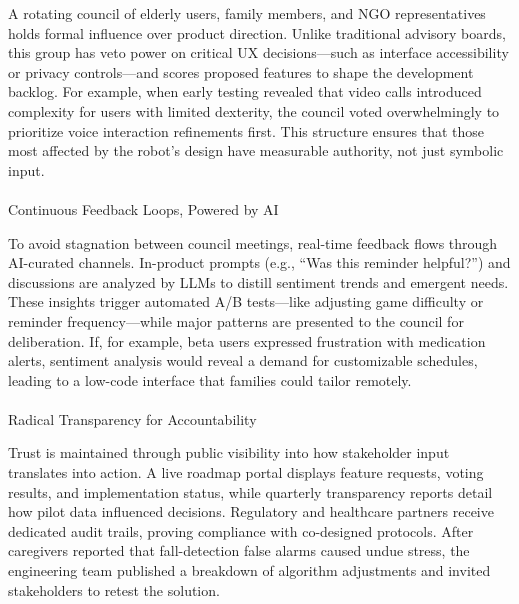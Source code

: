 \documentclass[
  letterpaper,
  DIV=11,
  numbers=noendperiod]{scrartcl}
\makeatletter
\let\oldparagraph\paragraph
\renewcommand{\paragraph}{
    \@ifstar
      \xxxParagraphStar
      \xxxParagraphNoStar
  }
\newcommand{\xxxParagraphStar}[1]{\oldparagraph*{#1}\mbox{}}
\newcommand{\xxxParagraphNoStar}[1]{\oldparagraph{#1}\mbox{}}
\makeatother
\begin{document}
A rotating council of elderly users, family members, and NGO
representatives holds formal influence over product direction. Unlike
traditional advisory boards, this group has veto power on critical UX
decisions---such as interface accessibility or privacy controls---and
scores proposed features to shape the development backlog. For example,
when early testing revealed that video calls introduced complexity for
users with limited dexterity, the council voted overwhelmingly to
prioritize voice interaction refinements first. This structure ensures
that those most affected by the robot's design have measurable
authority, not just symbolic input.

\paragraph{Continuous Feedback Loops, Powered by
AI}\label{continuous-feedback-loops-powered-by-ai}

To avoid stagnation between council meetings, real-time feedback flows
through AI-curated channels. In-product prompts (e.g., ``Was this
reminder helpful?'') and discussions are analyzed by LLMs to distill
sentiment trends and emergent needs. These insights trigger automated
A/B tests---like adjusting game difficulty or reminder frequency---while
major patterns are presented to the council for deliberation. If, for
example, beta users expressed frustration with medication alerts,
sentiment analysis would reveal a demand for customizable schedules,
leading to a low-code interface that families could tailor remotely.

\paragraph{Radical Transparency for
Accountability}\label{radical-transparency-for-accountability}

Trust is maintained through public visibility into how stakeholder input
translates into action. A live roadmap portal displays feature requests,
voting results, and implementation status, while quarterly transparency
reports detail how pilot data influenced decisions. Regulatory and
healthcare partners receive dedicated audit trails, proving compliance
with co-designed protocols. After caregivers reported that
fall-detection false alarms caused undue stress, the engineering team
published a breakdown of algorithm adjustments and invited stakeholders
to retest the solution.
\end{document}
